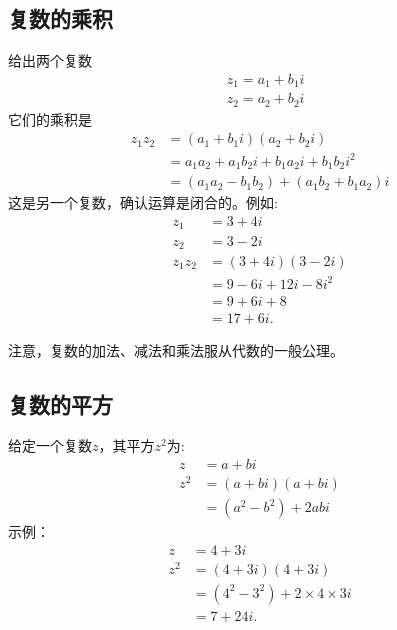 \subsection{复数的乘积}
给出两个复数
$$
  \begin{aligned}
     & z_{1}=a_{1}+b_{1} i \\
     & z_{2}=a_{2}+b_{2} i
  \end{aligned}
$$
它们的乘积是
$$
  \begin{aligned}
    z_{1} z_{2} & =\left(a_{1}+b_{1} i\right)\left(a_{2}+b_{2} i\right)                        \\
                & =a_{1} a_{2}+a_{1} b_{2} i+b_{1} a_{2} i+b_{1} b_{2} i^{2}                   \\
                & =\left(a_{1} a_{2}-b_{1} b_{2}\right)+\left(a_{1} b_{2}+b_{1} a_{2}\right) i
  \end{aligned}
$$
这是另一个复数，确认运算是闭合的。例如:
$$
  \begin{aligned}
    z_{1}       & =3+4 i              \\
    z_{2}       & =3-2 i              \\
    z_{1} z_{2} & =(3+4 i)(3-2 i)     \\
                & =9-6 i+12 i-8 i^{2} \\
                & =9+6 i+8            \\
                & =17+6 i .
  \end{aligned}
$$

注意，复数的加法、减法和乘法服从代数的一般公理。

\subsection{复数的平方}
给定一个复数$z$，其平方$z^{2}$为:
$$
  \begin{aligned}
    z     & =a+b i                            \\
    z^{2} & =(a+b i)(a+b i)                   \\
          & =\left(a^{2}-b^{2}\right)+2 a b i
  \end{aligned}
$$
示例：
$$
  \begin{aligned}
    z     & =4+3 i                                          \\
    z^{2} & =(4+3 i)(4+3 i)                                 \\
          & =\left(4^{2}-3^{2}\right)+2 \times 4 \times 3 i \\
          & =7+24 i .
  \end{aligned}
$$

